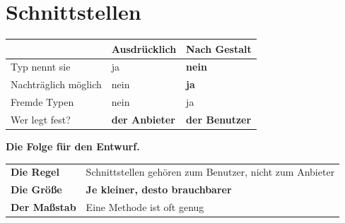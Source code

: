 \chapter{Schnittstellen}\label{kap:schnittstellen}

\begin{merksatz}
\begin{center}
\renewcommand{\arraystretch}{1.5}
\begin{tabular}{@{}P{2.6cm}P{2.8cm}P{2.8cm}@{}}
\toprule
& \textbf{Ausdrücklich} & \textbf{Nach Gestalt}\\
\midrule
Typ nennt sie & \textcolor{gruen}{ja} & \textcolor{akzent}{\textbf{nein}}\\
Nachträglich möglich & \textcolor{akzent}{nein} & \textcolor{gruen}{\textbf{ja}}\\
Fremde Typen & \textcolor{akzent}{nein} & \textcolor{gruen}{ja}\\
Wer legt fest? & \textbf{der Anbieter} & \textcolor{gruen}{\textbf{der Benutzer}}\\
\bottomrule
\end{tabular}
\end{center}

\begin{center}
\begin{minipage}{0.88\textwidth}
\end{minipage}
\end{center}

\textbf{Die Folge für den Entwurf.}

\begin{center}
\renewcommand{\arraystretch}{1.5}
\begin{tabular}{@{}P{2.8cm}P{6.2cm}@{}}
\toprule
\textbf{Die Regel} & Schnittstellen gehören zum Benutzer, nicht zum Anbieter\\
\textbf{Die Größe} & \textbf{Je kleiner, desto brauchbarer}\\
\textbf{Der Maßstab} & Eine Methode ist oft genug\\
\bottomrule
\end{tabular}
\end{center}

\begin{center}
\end{center}


\end{merksatz}
